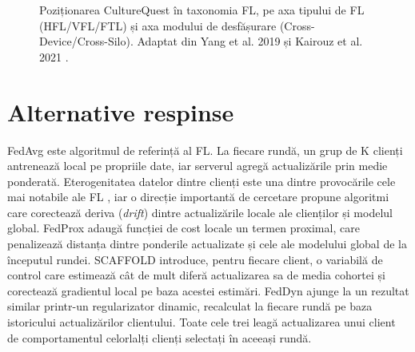 \documentclass[12pt,a4paper]{report}
\begin{document}
\begin{figure}[h]
\centering
{}
\caption{Poziționarea CultureQuest în taxonomia FL, pe axa tipului de FL (HFL/VFL/FTL) și axa modului de desfășurare (Cross-Device/Cross-Silo). Adaptat din Yang et al. 2019 \cite{yang2019fml} și Kairouz et al. 2021 \cite{kairouz2021advances}.}
\label{fig:taxonomie-fl}
\end{figure}

\section{Alternative respinse}

FedAvg \cite{mcmahan2017fedavg} este algoritmul de referință al FL. La fiecare rundă, un grup de K clienți antrenează local pe propriile date, iar serverul agregă actualizările prin medie ponderată. Eterogenitatea datelor dintre clienți este una dintre provocările cele mai notabile ale FL \cite{li2020challenges}, iar o direcție importantă de cercetare propune algoritmi care corectează deriva (\textit{drift}) dintre actualizările locale ale clienților și modelul global. FedProx \cite{li2020fedprox} adaugă funcției de cost locale un termen proximal, care penalizează distanța dintre ponderile actualizate și cele ale modelului global de la începutul rundei. SCAFFOLD \cite{karimireddy2020scaffold} introduce, pentru fiecare client, o variabilă de control care estimează cât de mult diferă actualizarea sa de media cohortei și corectează gradientul local pe baza acestei estimări. FedDyn \cite{acar2021feddyn} ajunge la un rezultat similar printr-un regularizator dinamic, recalculat la fiecare rundă pe baza istoricului actualizărilor clientului. Toate cele trei leagă actualizarea unui client de comportamentul celorlalți clienți selectați în aceeași rundă.
\end{document}
